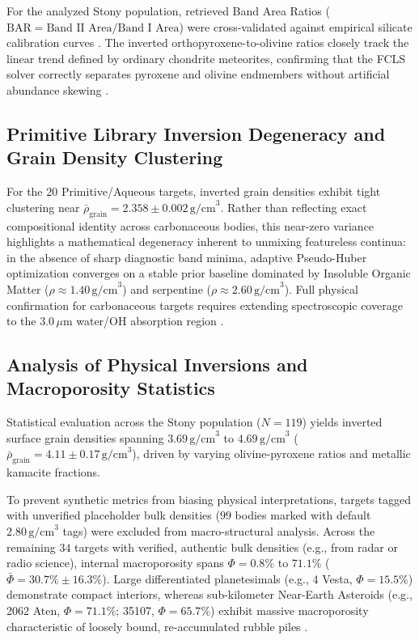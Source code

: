 \documentclass[11pt,a4paper]{article}
\begin{document}
For the analyzed Stony population, retrieved Band Area Ratios ($\text{BAR} = \text{Band II Area} / \text{Band I Area}$) were cross-validated against empirical silicate calibration curves \cite{Gaffey1993, Dunn2010}. The inverted orthopyroxene-to-olivine ratios closely track the linear trend defined by ordinary chondrite meteorites, confirming that the FCLS solver correctly separates pyroxene and olivine endmembers without artificial abundance skewing \cite{Gaffey1993, Dunn2010, Lawson1995}.

\subsection{Primitive Library Inversion Degeneracy and Grain Density Clustering}
For the $20$ Primitive/Aqueous targets, inverted grain densities exhibit tight clustering near $\bar{\rho}_{\text{grain}} = 2.358 \pm 0.002\,\text{g/cm}^3$. Rather than reflecting exact compositional identity across carbonaceous bodies, this near-zero variance highlights a mathematical degeneracy inherent to unmixing featureless continua: in the absence of sharp diagnostic band minima, adaptive Pseudo-Huber optimization converges on a stable prior baseline dominated by Insoluble Organic Matter ($\rho \approx 1.40\,\text{g/cm}^3$) and serpentine ($\rho \approx 2.60\,\text{g/cm}^3$). Full physical confirmation for carbonaceous targets requires extending spectroscopic coverage to the $3.0\,\mu\text{m}$ water/OH absorption region \cite{Rivkin2002}.

\subsection{Analysis of Physical Inversions and Macroporosity Statistics}
Statistical evaluation across the Stony population ($N=119$) yields inverted surface grain densities spanning $3.69\,\text{g/cm}^3$ to $4.69\,\text{g/cm}^3$ ($\bar{\rho}_{\text{grain}} = 4.11 \pm 0.17\,\text{g/cm}^3$), driven by varying olivine-pyroxene ratios and metallic kamacite fractions.

To prevent synthetic metrics from biasing physical interpretations, targets tagged with unverified placeholder bulk densities ($99$ bodies marked with default $2.80\,\text{g/cm}^3$ tags) were excluded from macro-structural analysis. Across the remaining $34$ targets with verified, authentic bulk densities (e.g., from radar or radio science), internal macroporosity spans $\Phi = 0.8\%$ to $71.1\%$ ($\bar{\Phi} = 30.7\% \pm 16.3\%$). Large differentiated planetesimals (e.g., 4 Vesta, $\Phi = 15.5\%$) demonstrate compact interiors, whereas sub-kilometer Near-Earth Asteroids (e.g., 2062 Aten, $\Phi = 71.1\%$; 35107, $\Phi = 65.7\%$) exhibit massive macroporosity characteristic of loosely bound, re-accumulated rubble piles \cite{Britt2002, Yeomans2000}.
\end{document}
